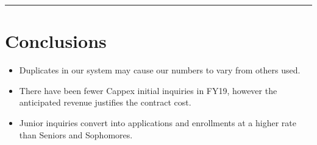 \documentclass[]{article}
\begin{document}
\begin{center}\rule{0.5\linewidth}{\linethickness}\end{center}

\hypertarget{conclusions}{%
\section{Conclusions}\label{conclusions}}

\begin{itemize}
\item
  Duplicates in our system may cause our numbers to vary from others
  used.
\item
  There have been fewer Cappex initial inquiries in FY19, however the
  anticipated revenue justifies the contract cost.
\item
  Junior inquiries convert into applications and enrollments at a higher
  rate than Seniors and Sophomores.
\end{itemize}
\end{document}
